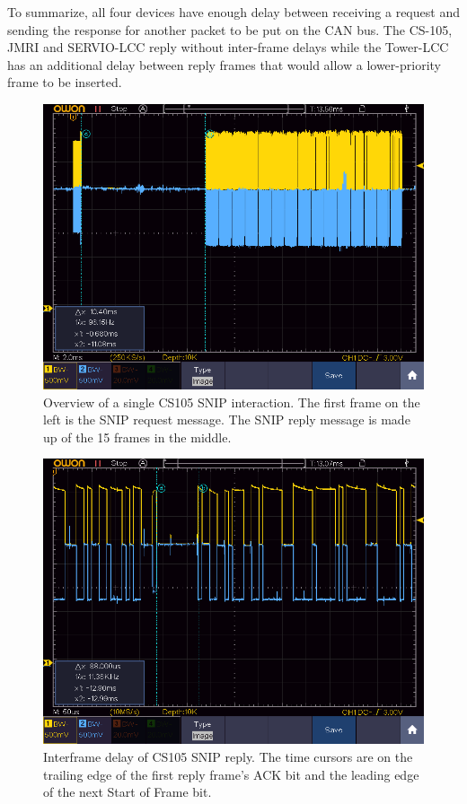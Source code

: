 \documentclass[11pt]{article}
\begin{document}
To summarize, all four devices have enough delay 
between receiving a request and sending the response
for another packet to be put on the CAN bus. 
\cbstart
The CS-105, JMRI and SERVIO-LCC
reply without inter-frame delays while the Tower-LCC
has an additional delay between reply frames that would
allow a lower-priority frame to be inserted.
\cbend

\begin{figure}[!htbp]
\centering
\includegraphics[width=1.0\linewidth]{1SNIP_CS105_Full}
\caption{Overview of a single CS105 SNIP interaction. 
The first frame on the left is the SNIP request message.
The SNIP reply message is made up of the 15 frames in the middle.}
\label{fig:single_CS105_SNIP_interaction}
\end{figure}

\begin{figure}[!htbp]
\centering
\includegraphics[width=1.0\linewidth]{1SNIP_CS105_Spacing}
\caption{Interframe delay of CS105 SNIP reply. 
The time cursors are on the trailing edge of the first reply frame's ACK bit 
and the leading edge of the next Start of Frame bit.}
\label{fig:single_CS105_SNIP_interframe}
\end{figure}
\end{document}
